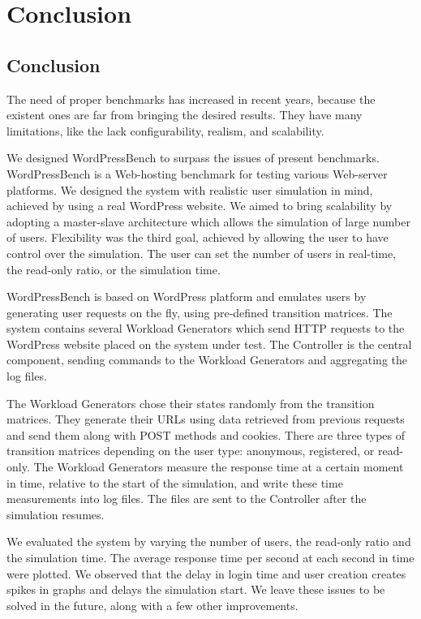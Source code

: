 \chapter{Conclusion}
\label{chapter:chapter6}

\section{Conclusion}
\label{sec:system-architecture}

The need of proper benchmarks has increased in recent years, because the existent ones are far from bringing the desired results. They have many limitations, like the lack configurability, realism, and scalability.

We designed WordPressBench to surpass the issues of present benchmarks. WordPressBench is a Web-hosting benchmark for testing various Web-server platforms. We designed the system with realistic user simulation in mind, achieved by using a real WordPress website. We aimed to bring scalability by adopting a master-slave architecture which allows the simulation of large number of users. Flexibility was the third goal, achieved by allowing the user to have control over the simulation. The user can set the number of users in real-time, the read-only ratio, or the simulation time.

WordPressBench is based on WordPress platform and emulates users by generating user requests on the fly, using pre-defined transition matrices. The system contains several Workload Generators which send HTTP requests to the WordPress website placed on the system under test. The Controller is the central component, sending commands to the Workload Generators and aggregating the log files.

The Workload Generators chose their states randomly from the transition matrices. They generate their URLs using data retrieved from previous requests and send them along with POST methods and cookies. There are three types of transition matrices depending on the user type: anonymous, registered, or read-only. The Workload Generators measure the response time at a certain moment in time, relative to the start of the simulation, and write these time measurements into log files. The files are sent to the Controller after the simulation resumes.

We evaluated the system by varying the number of users, the read-only ratio and the simulation time. The average response time per second at each second in time were plotted. We observed that the delay in login time and user creation creates spikes in graphs and delays the simulation start. We leave these issues to be solved in the future, along with a few other improvements.

